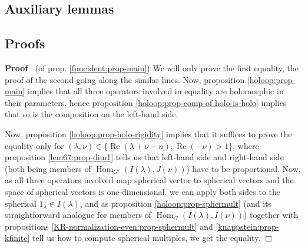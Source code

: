 \documentclass{article}
\newcommand{\tmop}[1]{\ensuremath{\operatorname{#1}}}
\newenvironment{proof}{\noindent\textbf{Proof\ }}{\hspace*{\fill}$\Box$\medskip}
\begin{document}
\subsection{Auxiliary lemmas}

\subsection{Proofs}

\begin{proof}
  (of prop. \ref{funcident:prop-main}) We will only prove the first equality,
  the proof of the second going along the similar lines. Now, proposition
  \ref{holoop:prop-main} implies that all three operators involved in equality
  are holomorphic in their parameters, hence proposition
  \ref{holoop:prop-comp-of-holo-is-holo} implies that so is the composition on
  the left-hand side.
  
  Now, proposition \ref{holoop:prop-holo-rigidity} implies that it suffices
  to prove the equality only for $(\lambda, \nu) \in \{ \tmop{Re} (\lambda +
  \nu - n), \tmop{Re} (- \nu) > 1 \}$, where proposition \ref{lem67:prop-dim1}
  tells us that left-hand side and right-hand side (both being members of
  $\tmop{Hom}_{G'} (I (\lambda), J (\nu))$) have to be proportional. Now, as
  all three operators involved map spherical vector to spherical vectors and
  the space of spherical vectors is one-dimensional, we can apply both sides
  to the spherical $1_{\lambda} \in I (\lambda)$, and as proposition
  \ref{holoop:prop-sphermult} (and its straightforward analogue for members of
  $\tmop{Hom}_G (I (\lambda), I (\nu))$) together with propositions
  \ref{KR-normalization-even:prop-sphermult} and \ref{knappstein:prop-kfinite}
  tell us how to compute spherical multiples, we get the equality.
\end{proof}

\

\
\end{document}
